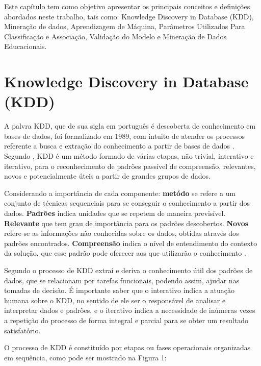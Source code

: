 \label{chapter:conceitos}
\par
Este capítulo tem como objetivo apresentar os principais conceitos e definições abordados neste trabalho, tais como: Knowledge Discovery in Database (KDD), Mineração de dados, Aprendizagem de Máquina, Parâmetros Utilizados Para Classificação e Associação, Validação do Modelo e Mineração de Dados Educacionais.

\section{Knowledge Discovery in Database (KDD)}

A palvra KDD, que de sua sigla em português é descoberta de conhecimento em bases de dados, foi formalizado em 1989, com intuito de atender os processos referente a busca e extração do conhecimento a partir de bases de dados \cite{Isamir2010}. Segundo , KDD é um método formado de várias etapas, não trivial, interativo e iterativo, para o reconhecimento de padrões passível de compreensão, relevantes, novos e potencialmente úteis a partir de grandes grupos de dados.

\par
Considerando a importância de cada componente: \textbf{metódo} se refere a um conjunto de técnicas sequenciais para se conseguir o conhecimento a partir dos dados. \textbf{Padrões} indica unidades que se repetem de maneira previsível. \textbf{Relevante} que tem grau de importância para os padrões descobertos. \textbf{Novos} refere-se as informações não conhecidas sobre os dados, obtidas através dos padrões encontrados. \textbf{Compreensão} indica o nível de entendimento do contexto da solução, que esse padrão pode oferecer aos que utilizarão o conhecimento \cite{Marques2014}.

\par
Segundo \cite{Isamir2010} o processo de KDD extraí e deriva o conhecimento útil dos padrões de dados, que se relacionam por tarefas funcionais, podendo assim, ajudar nas tomadas de decisão. É importante saber que o interativo indica a atuação humana sobre o KDD, no sentido de ele ser o responsável de analisar e interpretar dados e padrões, e o iterativo indica a necessidade de inúmeras vezes a repetição do processo de forma integral e parcial para se obter um resultado satisfatório.

\par
O processo de KDD é constituído por etapas ou fases operacionais organizadas em sequência, como pode ser mostrado na Figura 1:

